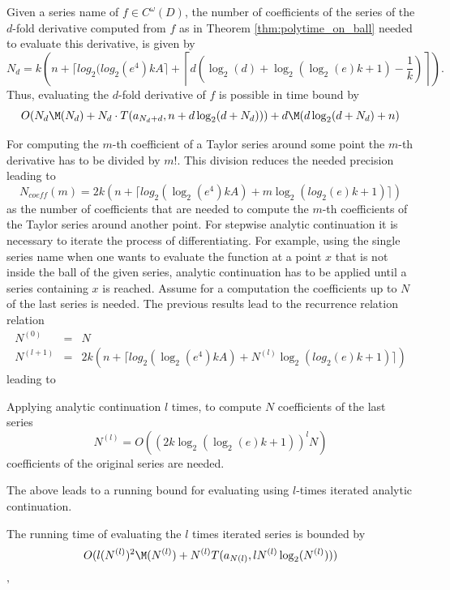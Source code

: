 		\begin{theorem}
			Given a series name of $f \in C^\omega(D)$, the number of coefficients of the series of the $d$-fold derivative computed from $f$ as in Theorem \ref{thm:polytime_on_ball} needed to evaluate this derivative, is given by 
			$$N_d = k\left(n+\lceil log_2(log_2 (e^4) kA \rceil+\left \lceil d\left(\log_2(d)+\log_2(\log_2(e)k+1)-\frac{1}{k}\right)\right\rceil\right).$$
			Thus, evaluating the $d$-fold derivative of $f$ is possible in time bound by
			$$ O(N_d\M(N_d)+N_d \cdot T(a_{N_d+d}, n+d\log_2(d+N_d)))+d\M(d \log_2 (d+N_d)+n) $$ 
		\end{theorem}
		For computing the $m$-th coefficient of a Taylor series around some point the $m$-th derivative 
		has to be divided by $m!$. This division reduces the needed precision leading to 
		$$N_{coeff}(m) = 2k\left( n+\lceil log_2(\log_2 (e^4) kA) + m \log_2(log_2(e)k+1)\rceil \right)$$
		as the number of coefficients that are needed to compute the $m$-th coefficients of the Taylor series 
		around another point. 
		For stepwise analytic continuation it is necessary to iterate the process of differentiating.
		For example, using the single series name when one wants to evaluate the function at a point $x$
		that is not inside the ball of the given series, analytic continuation has to be applied until a series
		containing $x$ is reached.
		Assume for a computation the coefficients up to $N$ of the last series is needed. 
		The previous results lead to the recurrence relation
		relation 
		\begin{eqnarray*}
			N^{(0)} &=& N \\
			N^{(l+1)} &=& 2k\left( n+\lceil log_2(\log_2 (e^4) kA) + N^{(l)} \log_2(log_2(e)k+1)\rceil \right)
		\end{eqnarray*}
		leading to
		\begin{theorem}
			Applying analytic continuation $l$ times, to compute $N$ coefficients of the last series 
			\begin{equation}
				N^{(l)} = O((2k \log_2 (\log_2 (e)k +1))^lN) 
			\end{equation}
			coefficients of the original series are needed.
		\end{theorem}
		The above leads to a running bound for evaluating using $l$-times iterated analytic continuation.
		\begin{theorem}
			The running time of evaluating the $l$ times iterated series is bounded by
			\begin{equation}
				 O(l(N^{(l)})^2\M(N^{(l)})+N^{(l)}T(a_{N(l)}, l N^{(l)}\log_2(N^{(l)}))) 
			\end{equation}
		\end{theorem}'
